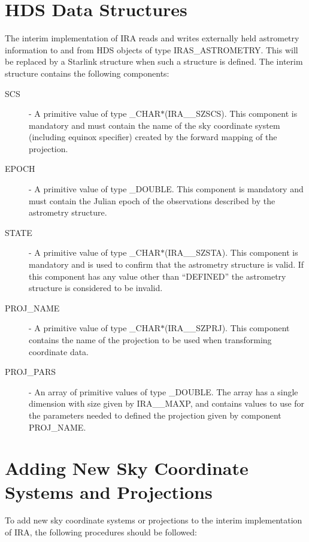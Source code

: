 \section {HDS Data Structures}
The interim implementation of IRA reads and writes externally held astrometry
information to and from HDS objects of type IRAS\_ASTROMETRY. This will be
replaced by a Starlink structure when such a structure is defined. The interim
structure contains the following components: 
\begin {description}

\item [SCS] - A primitive value of type \_CHAR$*$(IRA\_\_SZSCS). This component
is mandatory and must contain the name of the sky coordinate system (including 
equinox specifier) created by the forward mapping of the projection. 

\item [EPOCH] - A primitive value of type \_DOUBLE. This component
is mandatory and must contain the Julian epoch of the observations described by 
the astrometry structure.

\item [STATE] - A primitive value of type \_CHAR$*$(IRA\_\_SZSTA). This
component is mandatory and is used to confirm that the astrometry structure is
valid. If this component has any value other than ``DEFINED'' the astrometry 
structure is considered to be invalid.

\item [PROJ\_NAME] - A primitive value of type \_CHAR$*$(IRA\_\_SZPRJ). This
component contains the name of the projection to be used when transforming
coordinate data. 

\item [PROJ\_PARS] - An array of primitive values of type \_DOUBLE. The array
has a single dimension with size given by IRA\_\_MAXP, and contains values to
use for the parameters needed to defined the projection given by component
PROJ\_NAME. 

\end {description}

\section {Adding New Sky Coordinate Systems and Projections}
To add new sky coordinate systems or projections to the interim implementation
of IRA, the following procedures should be followed: 

